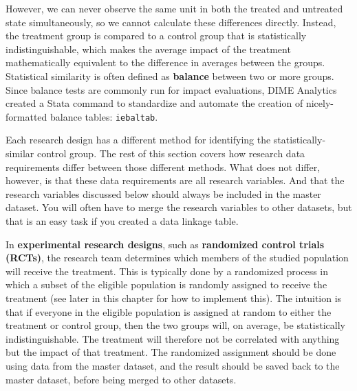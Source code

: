 However, we can never observe the same unit
in both the treated and untreated state simultaneously,
so we cannot calculate these differences directly.
Instead, the treatment group is compared to a control group
that is statistically indistinguishable,
which makes the average impact of the treatment
mathematically equivalent to
the difference in averages between the groups.
Statistical similarity is often defined
as \textbf{balance} between two or more groups.
Since balance tests are commonly run for impact evaluations,
DIME Analytics created a Stata command to
standardize and automate the creation of nicely-formatted balance tables:
\texttt{iebaltab}.

Each research design has a different method for
identifying the statistically-similar control group.
The rest of this section covers how research data requirements
differ between those different methods.
What does not differ, however,
is that these data requirements are all research variables.
And that the research variables discussed below
should always be included in the master dataset.
You will often have to merge
the research variables to other datasets,
but that is an easy task
if you created a data linkage table.



In \textbf{experimental research designs},
such as
\textbf{randomized control trials (RCTs)},
the research team determines which members
of the studied population will receive the treatment.
This is typically done by a randomized process
in which a subset of the eligible population
is randomly assigned to receive the treatment
(see later in this chapter for how to implement this).
The intuition is that if everyone in the eligible population
is assigned at random to either the treatment or control group,
then the two groups will, on average, be statistically indistinguishable.
The treatment will therefore not be correlated with anything
but the impact of that treatment.\cite{duflo2007using}
The randomized assignment should be done
using data from the master dataset,
and the result should be saved back to the master dataset,
before being merged to other datasets.


